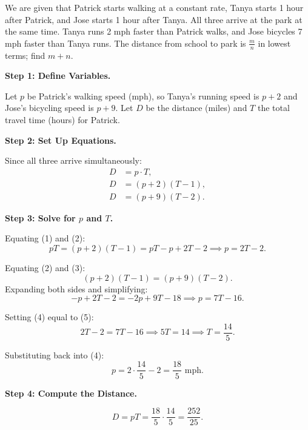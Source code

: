 \documentclass{llmxive}
\begin{document}
\begin{tcolorbox}[title=The early training stage model (unscaled), breakable]

We are given that Patrick starts walking at a constant rate, Tanya starts 1 hour after Patrick, and Jose starts 1 hour after Tanya. All three arrive at the park at the same   
time. Tanya runs 2 mph faster than Patrick walks, and Jose bicycles 7 mph faster than Tanya runs. The distance from school to park is $\tfrac{m}{n}$ in lowest terms; find
$m+n$.                                                                                                                                                                         
              
\medskip
\textbf{Step 1: Define Variables.}

Let $p$ be Patrick's walking speed (mph), so Tanya's running speed is $p+2$ and Jose's bicycling speed is $p+9$. Let $D$ be the distance (miles) and $T$ the total travel time
(hours) for Patrick.

\medskip
\textbf{Step 2: Set Up Equations.}

Since all three arrive simultaneously:
\begin{align}
D &= p \cdot T, \tag{1}\\
D &= (p+2)(T-1), \tag{2}\\
D &= (p+9)(T-2). \tag{3}
\end{align}

\medskip
\textbf{Step 3: Solve for $p$ and $T$.}

Equating (1) and (2):
\[
pT = (p+2)(T-1) = pT - p + 2T - 2
\implies p = 2T - 2. \tag{4}
\]

Equating (2) and (3):
\[
(p+2)(T-1) = (p+9)(T-2).
\]
Expanding both sides and simplifying:
\[
-p + 2T - 2 = -2p + 9T - 18
\implies p = 7T - 16. \tag{5}
\]

Setting (4) equal to (5):
\[
2T - 2 = 7T - 16 \implies 5T = 14 \implies T = \frac{14}{5}.
\]                                                                                                                                                                             

Substituting back into (4):                                                                                                                                                    
\[              
p = 2\cdot\frac{14}{5} - 2 = \frac{18}{5} \text{ mph}.
\]

\medskip
\textbf{Step 4: Compute the Distance.}

\[
D = pT = \frac{18}{5} \cdot \frac{14}{5} = \frac{252}{25}.
\]


\end{tcolorbox}
\end{document}
